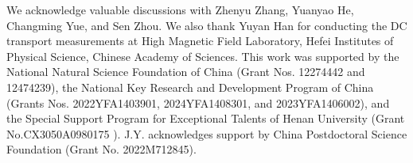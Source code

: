 \documentclass[prl,floatfix,twocolumn,superscriptaddress]{revtex4-2}
\begin{document}
\begin{acknowledgments}
We acknowledge valuable discussions with Zhenyu Zhang, Yuanyao He, Changming Yue, and Sen Zhou. We also thank Yuyan Han for conducting the DC transport measurements at High Magnetic Field Laboratory, Hefei Institutes of Physical Science, Chinese Academy of Sciences. This work was supported by the National Natural Science Foundation of China (Grant Nos. 12274442 and 12474239), the National Key Research and Development Program of China (Grants Nos. 2022YFA1403901, 2024YFA1408301, and 2023YFA1406002), and the Special Support Program for Exceptional Talents of Henan University  (Grant No.CX3050A0980175 ). J.Y. acknowledges support by China Postdoctoral Science Foundation (Grant No. 2022M712845).
\end{acknowledgments}
\end{document}
